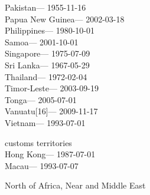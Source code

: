 \hspace*{0.333em}Pakistan--- 1955-11-16\\
\hspace*{0.333em}Papua New Guinea--- 2002-03-18\\
\hspace*{0.333em}Philippines--- 1980-10-01\\
\hspace*{0.333em}Samoa--- 2001-10-01\\
\hspace*{0.333em}Singapore--- 1975-07-09\\
\hspace*{0.333em}Sri Lanka--- 1967-05-29\\
\hspace*{0.333em}Thailand--- 1972-02-04\\
\hspace*{0.333em}Timor-Leste--- 2003-09-19\\
\hspace*{0.333em}Tonga--- 2005-07-01\\
\hspace*{0.333em}Vanuatu{[}16{]}--- 2009-11-17\\
\hspace*{0.333em}Vietnam--- 1993-07-01

customs territories\\
\hspace*{0.333em}Hong Kong--- 1987-07-01\\
\hspace*{0.333em}Macau--- 1993-07-07

North of Africa, Near and Middle East

